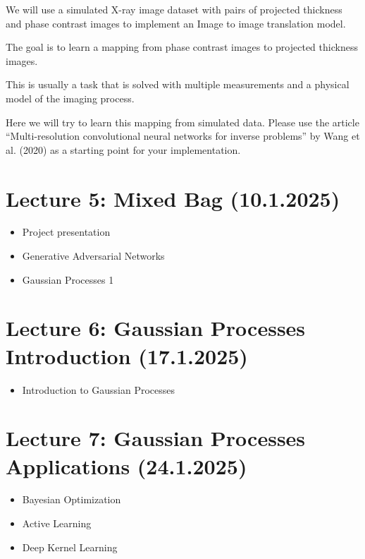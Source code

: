 \documentclass[
]{agujournal2019}
\providecommand{\tightlist}{%
  \setlength{\itemsep}{0pt}\setlength{\parskip}{0pt}}\usepackage{longtable,booktabs,array}
\begin{document}
\begin{enumerate}
  We will use a simulated X-ray image dataset with pairs of projected
  thickness and phase contrast images to implement an Image to image
  translation model.

  The goal is to learn a mapping from phase contrast images to projected
  thickness images.

  This is usually a task that is solved with multiple measurements and a
  physical model of the imaging process.

  Here we will try to learn this mapping from simulated data. Please use
  the article ``Multi-resolution convolutional neural networks for
  inverse problems'' by Wang et al. (2020) as a starting point for your
  implementation.
\end{enumerate}

\section{Lecture 5: Mixed Bag (10.1.2025)}\label{sec-lecture6}

\begin{itemize}
\tightlist
\item
  Project presentation
\item
  Generative Adversarial Networks
\item
  Gaussian Processes 1
\end{itemize}

\section{Lecture 6: Gaussian Processes Introduction
(17.1.2025)}\label{sec-lecture7}

\begin{itemize}
\tightlist
\item
  Introduction to Gaussian Processes
\end{itemize}

\section{Lecture 7: Gaussian Processes Applications
(24.1.2025)}\label{sec-lecture8}

\begin{itemize}
\tightlist
\item
  Bayesian Optimization
\item
  Active Learning
\item
  Deep Kernel Learning
\end{itemize}
\end{document}
